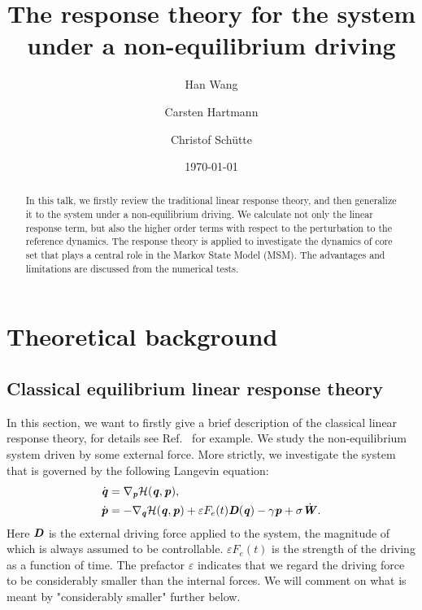 \documentclass[aip,jcp,a4paper,reprint,onecolumn]{revtex4-1}
\newcommand{\vect}[1]{\textbf{\textit{#1}}}
\newcommand{\mh}{\mathcal H}
\newcommand{\eps}{\varepsilon}
\begin{document}
\title{The response theory for the system under a non-equilibrium driving}
\author{Han Wang}
\author{Carsten Hartmann}
\author{Christof Sch\"utte}

\date{\today}

\begin{abstract}
  In this talk, we firstly review the traditional linear response
  theory, and then generalize it to the system under a non-equilibrium
  driving. We calculate not only the linear response term, but also
  the higher order terms with respect to the perturbation to the
  reference dynamics. The response theory is applied to investigate
  the dynamics of core set that plays a central role in the Markov
  State Model (MSM). The advantages and limitations are discussed from
  the numerical tests.
\end{abstract}

\maketitle

\section{Theoretical background}
\subsection{Classical equilibrium linear response theory}


In this section, we want to firstly give a brief description of the classical linear response
theory, for details see Ref.~\cite{tuckeman2010statistical} for
example.
We study the non-equilibrium system driven by some external force.
More strictly, we investigate the system that is governed by the
following Langevin equation:
\begin{align}\label{eqn:langevin-1}
  \dot{\vect q} & = \nabla_{\vect p}\mh(\vect q,\vect p), \\\label{eqn:langevin-2}
  \dot{\vect p} & =- \nabla_{\vect q}\mh(\vect q,\vect p)
  + \eps F_e(t) \vect D(\vect q) 
  - \gamma\vect p
  + \sigma\dot{\vect W}.
\end{align}
Here $\vect D$ is the external driving force applied to the system,
the magnitude of which is always assumed to be controllable.
$\eps F_e(t)$ is the strength of the driving as a function of time.
The prefactor $\eps$ indicates that we regard the driving force to be considerably smaller than the internal forces. We will comment on what is meant by "considerably smaller" further below.
\end{document}
